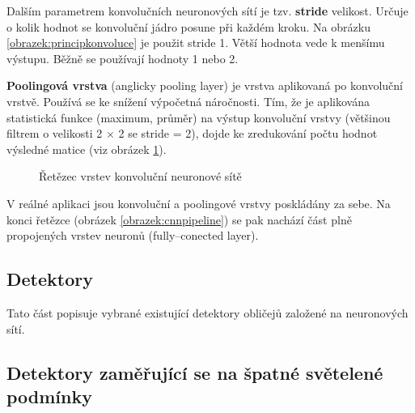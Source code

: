 Dalším parametrem konvolučních neuronových sítí je tzv. \textbf{stride} velikost. Určuje o kolik hodnot se konvoluční jádro posune při každém kroku. Na obrázku \ref{obrazek:principkonvoluce} je použit stride 1. Větší hodnota vede k menšímu výstupu. Běžně se používají hodnoty 1 nebo 2.

\textbf{Poolingová vrstva} (anglicky pooling layer) je vrstva aplikovaná po konvoluční vrstvě. Používá se ke snížení výpočetná náročnosti. Tím, že je aplikována statistická funkce (maximum, průměr) na výstup konvoluční vrstvy (většinou filtrem o velikosti 2 $\times$ 2 se stride = 2), dojde ke zredukování počtu hodnot výsledné matice (viz obrázek \ref{obrazek:cnnpooling}).

\begin{figure}[H]
  \begin{center}
  \label{obrazek:cnnpooling}
  \caption{Řetězec vrstev konvoluční neuronové sítě \cite{cnnCv}}
  \end{center}
\end{figure}

V reálné aplikaci jsou konvoluční a poolingové vrstvy poskládány za sebe. Na konci řetězce (obrázek \ref{obrazek:cnnpipeline}) se pak nachází část plně propojených vrstev neuronů (fully--conected layer).

\subsection*{Detektory}
Tato část popisuje vybrané existující detektory obličejů založené na neuronových sítí. 

\subsection*{Detektory zaměřující se na špatné světelené podmínky}

